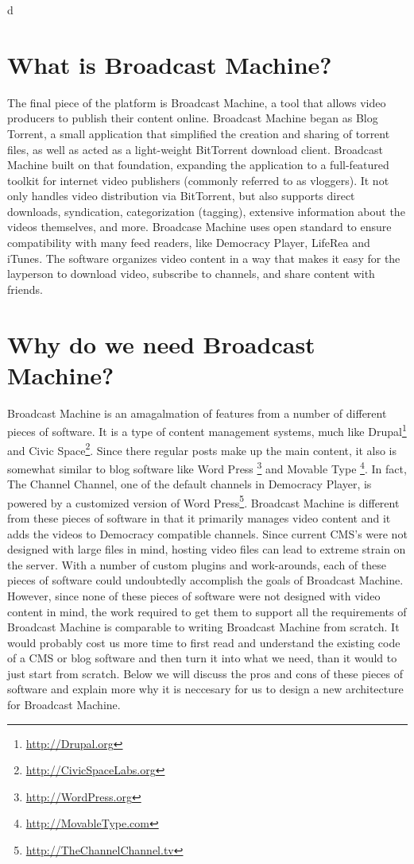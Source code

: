 d\documentclass[a4paper,12pt]{report}
\begin{document}
\section{What is Broadcast Machine?}
	The final piece of the platform is Broadcast Machine, a tool that allows video producers to publish their content online.
	Broadcast Machine began as Blog Torrent, a small application that simplified the creation and sharing of torrent files, as well as acted as a light-weight BitTorrent download client. 
Broadcast Machine built on that foundation, expanding the application to a full-featured toolkit for internet video publishers (commonly referred to as vloggers).
It not only handles video distribution via BitTorrent, but also supports direct downloads, syndication, categorization (tagging), extensive information about the videos themselves, and more.
Broadcase Machine uses open standard to ensure compatibility with many feed readers, like Democracy Player, LifeRea and iTunes.
The software organizes video content in a way that makes it easy for the layperson to download video, subscribe to channels, and share content with friends.

\section {Why do we need Broadcast Machine?}
	Broadcast Machine is an amagalmation of features from a number of different pieces of software. 
It is a type of content management systems, much like Drupal\footnote{\url{http://Drupal.org}} and Civic Space\footnote{\url{http://CivicSpaceLabs.org}}. 
Since there regular posts make up the main content, it also is somewhat similar to blog software like Word Press \footnote{\url{http://WordPress.org}} and Movable Type \footnote{\url{http://MovableType.com}}. 
In fact, The Channel Channel, one of the default channels in Democracy Player, is powered by a customized version of Word Press\footnote{\url{http://TheChannelChannel.tv}}. 
Broadcast Machine is different from these pieces of software in that it primarily manages video content and it adds the videos to Democracy compatible channels. 
Since current CMS's were not designed with large files in mind, hosting video files can lead to extreme strain on the server. 
With a number of custom plugins and work-arounds, each of these pieces of software could undoubtedly accomplish the goals of Broadcast Machine. 
However, since none of these pieces of software were not designed with video content in mind, the work required to get them to support all the requirements of Broadcast Machine is comparable to writing Broadcast Machine from scratch. 
It would probably cost us more time to first read and understand the existing code of a CMS or blog software and then turn it into what we need, than it would to just start from scratch. 
Below we will discuss the pros and cons of these pieces of software and explain more why it is neccesary for us to design a new architecture for Broadcast Machine. 
\end{document}
